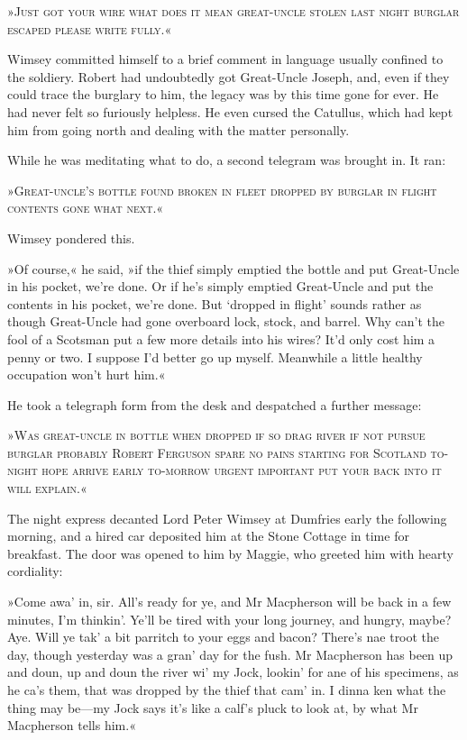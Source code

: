 »\textsc{Just got your wire what does it mean great-uncle stolen last night burglar escaped please write fully.}«

Wimsey committed himself to a brief comment in language usually confined to the soldiery. Robert had undoubtedly got Great-Uncle Joseph, and, even if they could trace the burglary to him, the legacy was by this time gone for ever. He had never felt so furiously helpless. He even cursed the Catullus, which had kept him from going north and dealing with the matter personally.

While he was meditating what to do, a second telegram was brought in. It ran:

»\textsc{Great-uncle's bottle found broken in fleet dropped by burglar in flight contents gone what next.}«

Wimsey pondered this.

»Of course,« he said, »if the thief simply emptied the bottle and put Great-Uncle in his pocket, we're done. Or if he's simply emptied Great-Uncle and put the contents in his pocket, we're done. But `dropped in flight' sounds rather as though Great-Uncle had gone overboard lock, stock, and barrel. Why can't the fool of a Scotsman put a few more details into his wires? It'd only cost him a penny or two. I suppose I'd better go up myself. Meanwhile a little healthy occupation won't hurt him.«

He took a telegraph form from the desk and despatched a further message:

»\textsc{Was great-uncle in bottle when dropped if so drag river if not pursue burglar probably Robert Ferguson spare no pains starting for Scotland to-night hope arrive early to-morrow urgent important put your back into it will explain.}«

The night express decanted Lord Peter Wimsey at Dumfries early the following morning, and a hired car deposited him at the Stone Cottage in time for breakfast. The door was opened to him by Maggie, who greeted him with hearty cordiality:

»Come awa' in, sir. All's ready for ye, and Mr Macpherson will be back in a few minutes, I'm thinkin'. Ye'll be tired with your long journey, and hungry, maybe? Aye. Will ye tak' a bit parritch to your eggs and bacon? There's nae troot the day, though yesterday was a gran' day for the fush. Mr Macpherson has been up and doun, up and doun the river wi' my Jock, lookin' for ane of his specimens, as he ca's them, that was dropped by the thief that cam' in. I dinna ken what the thing may be—my Jock says it's like a calf's pluck to look at, by what Mr Macpherson tells him.«


